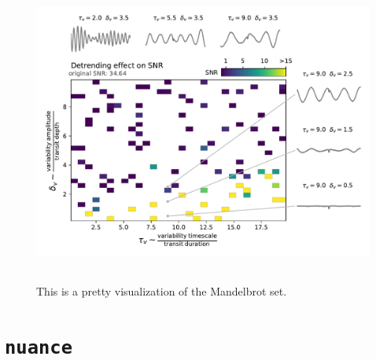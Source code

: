 \documentclass{aastex631}
\begin{document}
\begin{figure}[H]
    \begin{centering}
        \includegraphics[height=10cm]{../../workflows/cleaning_snr/figures/simu1/result.pdf}
        \caption{This is a pretty visualization of the Mandelbrot set.}
        \label{fig:snr_detrend}
    \end{centering}
\end{figure}

\section{\texttt{nuance}}



\end{document}
